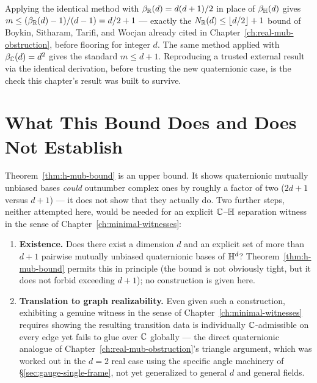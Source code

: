 \begin{remark}
Applying the identical method with $\beta_{\mathbb{R}}(d) = d(d+1)/2$ in place of
$\beta_{\mathbb{H}}(d)$ gives $m \le (\beta_{\mathbb{R}}(d)-1)/(d-1) = d/2+1$ — exactly the
$N_{\mathbb{R}}(d) \le \lfloor d/2\rfloor+1$ bound of Boykin, Sitharam, Tarifi, and
Wocjan already cited in Chapter~\ref{ch:real-mub-obstruction}, before
flooring for integer $d$. The same method applied with $\beta_{\mathbb{C}}(d)=d^2$
gives the standard $m\le d+1$. Reproducing a trusted external result via
the identical derivation, before trusting the new quaternionic case, is
the check this chapter's result was built to survive.
\end{remark}

\section{What This Bound Does and Does Not Establish}

Theorem~\ref{thm:h-mub-bound} is an upper bound. It shows quaternionic
mutually unbiased bases \emph{could} outnumber complex ones by roughly a
factor of two ($2d+1$ versus $d+1$) — it does not show that they actually
do. Two further steps, neither attempted here, would be needed for an
explicit $\mathbb{C}$--$\mathbb{H}$ separation witness in the sense of
Chapter~\ref{ch:minimal-witnesses}:

\begin{enumerate}
\item[(a)] \textbf{Existence.} Does there exist a dimension $d$ and an
explicit set of more than $d+1$ pairwise mutually unbiased quaternionic
bases of $\mathbb{H}^d$? Theorem~\ref{thm:h-mub-bound} permits this in
principle (the bound is not obviously tight, but it does not forbid
exceeding $d+1$); no construction is given here.
\item[(b)] \textbf{Translation to graph realizability.} Even given such a
construction, exhibiting a genuine witness in the sense of
Chapter~\ref{ch:minimal-witnesses} requires showing the resulting
transition data is individually $\mathbb{C}$-admissible on every edge yet fails to
glue over $\mathbb{C}$ globally — the direct quaternionic analogue of
Chapter~\ref{ch:real-mub-obstruction}'s triangle argument, which was
worked out in the $d=2$ real case using the specific angle machinery of
\S\ref{sec:gauge-single-frame}, not yet generalized to general $d$ and
general fields.
\end{enumerate}

